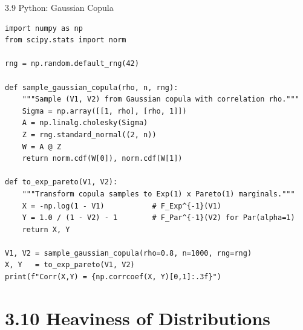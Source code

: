 \documentclass[aspectratio=169,10pt]{beamer}
\begin{document}
\begin{frame}[fragile]{3.9 Python: Gaussian Copula}
  \begin{lstlisting}[style=python, caption={Gaussian copula with specified marginals}]
import numpy as np
from scipy.stats import norm

rng = np.random.default_rng(42)

def sample_gaussian_copula(rho, n, rng):
    """Sample (V1, V2) from Gaussian copula with correlation rho."""
    Sigma = np.array([[1, rho], [rho, 1]])
    A = np.linalg.cholesky(Sigma)
    Z = rng.standard_normal((2, n))
    W = A @ Z
    return norm.cdf(W[0]), norm.cdf(W[1])

def to_exp_pareto(V1, V2):
    """Transform copula samples to Exp(1) x Pareto(1) marginals."""
    X = -np.log(1 - V1)           # F_Exp^{-1}(V1)
    Y = 1.0 / (1 - V2) - 1        # F_Par^{-1}(V2) for Par(alpha=1)
    return X, Y

V1, V2 = sample_gaussian_copula(rho=0.8, n=1000, rng=rng)
X, Y   = to_exp_pareto(V1, V2)
print(f"Corr(X,Y) = {np.corrcoef(X, Y)[0,1]:.3f}")
  \end{lstlisting}
\end{frame}

\section{3.10 Heaviness of Distributions}
\end{document}

